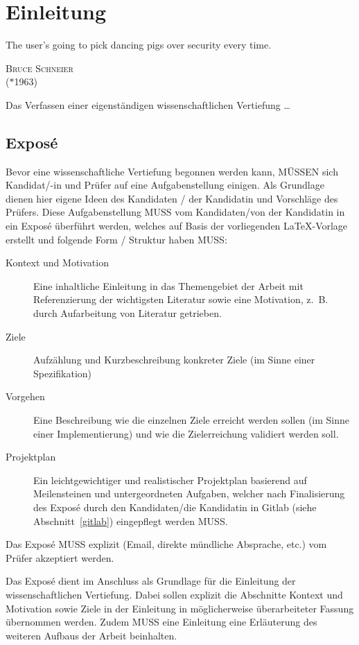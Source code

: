 \chapter{Einleitung}

\epigraph{\glqq The user's going to pick dancing pigs over security every time.\grqq\bigskip}
{\textsc{Bruce Schneier}\\ ($\ast$1963)}

\noindent
Das Verfassen einer eigenständigen wissenschaftlichen Vertiefung \dots
\indent

\section{Expos\'{e}}
\label{intro}

Bevor eine wissenschaftliche Vertiefung begonnen werden kann, MÜSSEN sich Kan\-di\-dat/-in und Prüfer
auf eine Aufgabenstellung einigen. Als Grundlage dienen hier eigene Ideen des Kandidaten / der
Kandidatin und Vorschläge des Prüfers. Diese Aufgabenstellung MUSS vom Kandidaten/von der Kandidatin
in ein Expos\'{e} überführt werden, welches auf Basis der vorliegenden \LaTeX-Vorlage erstellt
und folgende Form / Struktur haben MUSS:

\begin{description}
 \item[Kontext und Motivation] Eine inhaltliche Einleitung in das Themengebiet der Arbeit
 mit Referenzierung der wichtigsten Literatur sowie eine Motivation, z.\, B. durch Aufarbeitung
 von Literatur getrieben.
 \item[Ziele] Aufzählung und Kurzbeschreibung konkreter Ziele (im Sinne einer Spezifikation)
 \item[Vorgehen] Eine Beschreibung wie die einzelnen Ziele erreicht werden sollen (im Sinne einer Implementierung)
 und wie die Zielerreichung validiert werden soll.
 \item[Projektplan] Ein leichtgewichtiger und realistischer Projektplan basierend auf Meilensteinen
 und untergeordneten Aufgaben, welcher nach Finalisierung des Expos\'{e} durch den Kandidaten/die
 Kandidatin in Gitlab (siehe Abschnitt~\ref{gitlab}) eingepflegt werden MUSS.
\end{description}

Das Expos\'{e} MUSS explizit (Email, direkte mündliche Absprache, etc.) vom Prüfer akzeptiert werden.

Das Expos\'{e} dient im Anschluss als Grundlage für die Einleitung der wissenschaftlichen Vertiefung.
Dabei sollen explizit die Abschnitte Kontext und Motivation sowie Ziele in der Einleitung in möglicherweise
überarbeiteter Fassung übernommen werden. Zudem MUSS eine Einleitung eine Erläuterung des weiteren Aufbaus
der Arbeit beinhalten.

